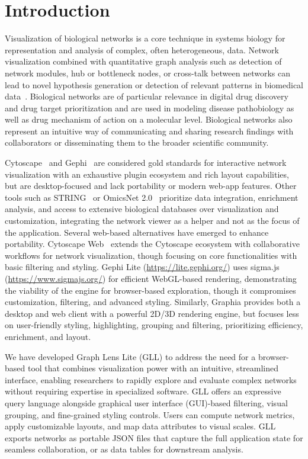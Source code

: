 \section{Introduction}
Visualization of biological networks is a core technique in systems biology for representation and analysis of complex, often heterogeneous, data. Network visualization combined with quantitative graph analysis such as detection of network modules, hub or bottleneck nodes, or cross-talk between networks can lead to novel hypothesis generation or detection of relevant patterns in biomedical data~\citep{ehlersIntroductionSurveyBiological2025}. Biological networks are of particular relevance in digital drug discovery and drug target prioritization and are used in modeling disease pathobiology as well as drug mechanism of action on a molecular level. Biological networks also represent an intuitive way of communicating and sharing research findings with collaborators or disseminating them to the broader scientific community.

Cytoscape~\citep{shannonCytoscapeSoftwareEnvironment2003} and Gephi~\citep{bastianGephiOpenSource2009} are considered gold standards for interactive network visualization with an exhaustive plugin ecosystem and rich layout capabilities, but are desktop-focused and lack portability or modern web-app features. Other tools such as STRING~\citep{szklarczykSTRINGDatabase20252025} or OmicsNet 2.0~\citep{zhouOmicsNet20Webbased2022} prioritize data integration, enrichment analysis, and access to extensive biological databases over visualization and customization, integrating the network viewer as a helper and not as the focus of the application. Several web-based alternatives have emerged to enhance portability. Cytoscape Web~\citep{onoCytoscapeWebBringing2025} extends the Cytoscape ecosystem with collaborative workflows for network visualization, though focusing on core functionalities with basic filtering and styling. Gephi Lite (\url{https://lite.gephi.org/}) uses sigma.js (\url{https://www.sigmajs.org/}) for efficient WebGL-based rendering, demonstrating the viability of the engine for browser-based exploration, though it compromises customization, filtering, and advanced styling. Similarly, Graphia\citep{freemanGraphiaPlatformGraphbased2022} provides both a desktop and web client with a powerful 2D/3D rendering engine, but focuses less on user-friendly styling, highlighting, grouping and filtering, prioritizing efficiency, enrichment, and layout.

We have developed Graph Lens Lite (GLL) to address the need for a browser-based tool that combines visualization power with an intuitive, streamlined interface, enabling researchers to rapidly explore and evaluate complex networks without requiring expertise in specialized software. GLL offers an expressive query language alongside graphical user interface (GUI)-based filtering, visual grouping, and fine-grained styling controls. Users can compute network metrics, apply customizable layouts, and map data attributes to visual scales. GLL exports networks as portable JSON files that capture the full application state for seamless collaboration, or as data tables for downstream analysis.

